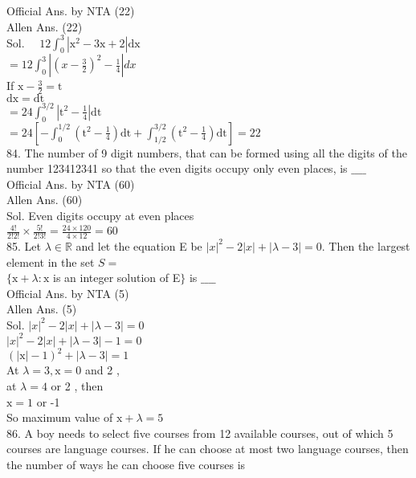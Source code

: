 \documentclass[10pt]{article}
\begin{document}
Official Ans. by NTA (22)\\
Allen Ans. (22)\\
Sol. \(\quad 12 \int_{0}^{3}\left|\mathrm{x}^{2}-3 \mathrm{x}+2\right| \mathrm{dx}\)\\
\(=12 \int_{0}^{3}\left|\left(x-\frac{3}{2}\right)^{2}-\frac{1}{4}\right| d x\)\\
If \(\mathrm{x}-\frac{3}{2}=\mathrm{t}\)\\
\(\mathrm{dx}=\mathrm{dt}\)\\
\(=24 \int_{0}^{3 / 2}\left|\mathrm{t}^{2}-\frac{1}{4}\right| \mathrm{dt}\)\\
\(=24\left[-\int_{0}^{1 / 2}\left(\mathrm{t}^{2}-\frac{1}{4}\right) \mathrm{dt}+\int_{1 / 2}^{3 / 2}\left(\mathrm{t}^{2}-\frac{1}{4}\right) \mathrm{dt}\right]=22\)\\
84. The number of 9 digit numbers, that can be formed using all the digits of the number 123412341 so that the even digits occupy only even places, is \(\_\_\_\_\)\\
Official Ans. by NTA (60)\\
Allen Ans. (60)\\
Sol. Even digits occupy at even places\\
\(\frac{4!}{2!2!} \times \frac{5!}{2!3!}=\frac{24 \times 120}{4 \times 12}=60\)\\
85. Let \(\lambda \in \mathbb{R}\) and let the equation E be \(|x|^{2}-2|x|+|\lambda-3|=0\). Then the largest element in the set \(S=\)\\
\(\{\mathrm{x}+\lambda: \mathrm{x}\) is an integer solution of E\(\}\) is \(\_\_\_\_\)\\
Official Ans. by NTA (5)\\
Allen Ans. (5)\\
Sol. \(|x|^{2}-2|x|+|\lambda-3|=0\)\\
\(|x|^{2}-2|x|+|\lambda-3|-1=0\)\\
\((|\mathrm{x}|-1)^{2}+|\lambda-3|=1\)\\
At \(\lambda=3, \mathrm{x}=0\) and 2 ,\\
at \(\lambda=4\) or 2 , then\\
\(\mathrm{x}=1\) or -1\\
So maximum value of \(\mathrm{x}+\lambda=5\)\\
86. A boy needs to select five courses from 12 available courses, out of which 5 courses are language courses. If he can choose at most two language courses, then the number of ways he can choose five courses is
\end{document}
